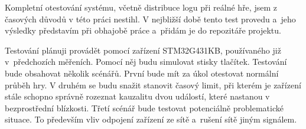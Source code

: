 {\sbf Kompletní otestování systému}, včetně distribuce logu při reálné hře, jsem z časových důvodů v této práci nestihl. V nejbližší době tento test provedu a~jeho výsledky představím při obhajobě práce a~přidám je do repozitáře projektu.

Testování plánuji provádět pomocí zařízení STM32G431KB, používaného již v~předchozích měřeních. Pomocí něj budu simulovat stisky tlačítek. Testování bude obsahovat několik scénářů. První bude mít za úkol otestovat normální průběh hry. V druhém se budu snažit stanovit časový limit, při kterém je zařízení stále schopno správně rozeznat kauzalitu dvou událostí, které nastanou v bezprostřední blízkosti. Třetí scénář bude testovat potenciálně problematické situace. To především vliv odpojení zařízení ze sítě a~rušení sítě jiným signálem.


